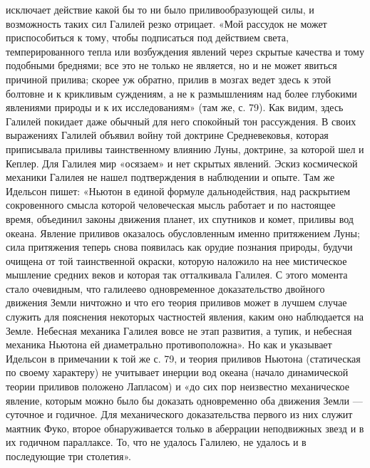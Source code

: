 исключает  действие какой  бы  то ни  было  приливообразующей силы,  и
возможность  таких  сил  Галилей  резко  отрицает.  «Мой  рассудок  не
может приспособиться  к тому,  чтобы подписаться под  действием света,
темперированного тепла или возбуждения  явлений через скрытые качества
и  тому подобными  бреднями;  все  это не  только  не  является, но  и
не  может  явиться  причиной  прилива; скорее  уж  обратно,  прилив  в
мозгах  ведет  здесь  к  этой  болтовне и  к  крикливым  суждениям,  а
не  к  размышлениям над  более  глубокими  явлениями  природы и  к  их
исследованиям» (там же, с. 79). Как видим, здесь Галилей покидает даже
обычный для него спокойный тон рассуждения. В своих выражениях Галилей
объявил войну той доктрине  Средневековья, которая приписывала приливы
таинственному влиянию  Луны, доктрине,  за которой  шел и  Кеплер. Для
Галилея  мир  «осязаем»  и  нет  скрытых  явлений.  Эскиз  космической
механики  Галилея не  нашел подтверждения  в наблюдении  и опыте.  Там
же  Идельсон  пишет:  «Ньютон  в единой  формуле  дальнодействия,  над
раскрытием сокровенного  смысла которой человеческая мысль  работает и
по настоящее время,  объединил законы движения планет,  их спутников и
комет, приливы  вод океана.  Явление приливов  оказалось обусловленным
именно  притяжением  Луны;  сила  притяжения  теперь  снова  появилась
как  орудие  познания  природы,  будучи очищена  от  той  таинственной
окраски, которую наложило на нее  мистическое мышление средних веков и
которая  так отталкивала  Галилея.  С этого  момента стало  очевидным,
что  галилеево одновременное  доказательство  двойного движения  Земли
ничтожно и что  его теория приливов может в лучшем  случае служить для
пояснения  некоторых  частностей  явления, каким  оно  наблюдается  на
Земле. Небесная  механика Галилея вовсе  не этап развития, а  тупик, и
небесная механика  Ньютона ей  диаметрально противоположна». Но  как и
указывает Идельсон  в примечании  к той  же с.  79, и  теория приливов
Ньютона  (статическая по  своему характеру)  не учитывает  инерции вод
океана (начало  динамической теории приливов положено  Лапласом) и «до
сих  пор  неизвестно  механическое  явление,  которым  можно  было  бы
доказать одновременно оба движения Земли  --- суточное и годичное. Для
механического  доказательства  первого  из них  служит  маятник  Фуко,
второе  обнаруживается только  в аберрации  неподвижных звезд  и в  их
годичном  параллаксе. То,  что  не  удалось Галилею,  не  удалось и  в
последующие три столетия».

